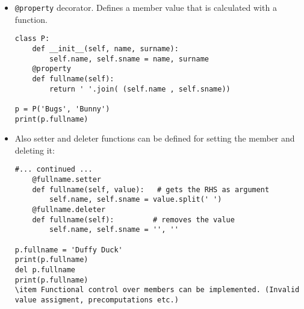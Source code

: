 \documentclass[trans,compress,xcolor=table]{beamer}
\begin{document}
\begin{frame}[fragile]
\small
\begin{itemize}
\item \lstinline!@property! decorator. Defines a member value that is calculated with a function.
\begin{lstlisting}[basicstyle=\tiny\tt]
class P:
    def __init__(self, name, surname):
        self.name, self.sname = name, surname
    @property
    def fullname(self):
        return ' '.join( (self.name , self.sname))

p = P('Bugs', 'Bunny')
print(p.fullname)
\end{lstlisting}
\item Also setter and deleter functions can be defined for setting the member and deleting it:
\begin{lstlisting}[basicstyle=\tiny\tt]
    #... continued ...
    @fullname.setter
    def fullname(self, value):   # gets the RHS as argument
        self.name, self.sname = value.split(' ')
	@fullname.deleter
	def fullname(self):			# removes the value
		self.name, self.sname = '', ''

p.fullname = 'Duffy Duck'
print(p.fullname)
del p.fullname
print(p.fullname)
\item Functional control over members can be implemented. (Invalid value assigment, precomputations etc.)
\end{lstlisting}

\end{itemize}
\end{frame}
\end{document}
